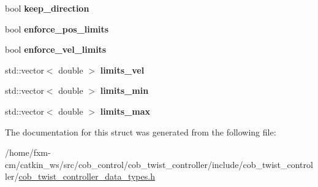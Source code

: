 \begin{DoxyCompactItemize}
\item 
\hypertarget{structTwistControllerParams_a18da932a0624fb5499507392175132cc}{bool {\bfseries keep\-\_\-direction}}\label{structTwistControllerParams_a18da932a0624fb5499507392175132cc}

\item 
\hypertarget{structTwistControllerParams_af84880928b522f0be3d1ed4558dab106}{bool {\bfseries enforce\-\_\-pos\-\_\-limits}}\label{structTwistControllerParams_af84880928b522f0be3d1ed4558dab106}

\item 
\hypertarget{structTwistControllerParams_a1b2aff868e1d52ec02aace9d36131a20}{bool {\bfseries enforce\-\_\-vel\-\_\-limits}}\label{structTwistControllerParams_a1b2aff868e1d52ec02aace9d36131a20}

\item 
\hypertarget{structTwistControllerParams_a86b1bc3844ddff53b417a19ccfc460be}{std\-::vector$<$ double $>$ {\bfseries limits\-\_\-vel}}\label{structTwistControllerParams_a86b1bc3844ddff53b417a19ccfc460be}

\item 
\hypertarget{structTwistControllerParams_af7544aceba6c8ab3397d2ee8dcbc5b4e}{std\-::vector$<$ double $>$ {\bfseries limits\-\_\-min}}\label{structTwistControllerParams_af7544aceba6c8ab3397d2ee8dcbc5b4e}

\item 
\hypertarget{structTwistControllerParams_a133e7f291118bdbda18a67df38eac6a8}{std\-::vector$<$ double $>$ {\bfseries limits\-\_\-max}}\label{structTwistControllerParams_a133e7f291118bdbda18a67df38eac6a8}

\end{DoxyCompactItemize}


The documentation for this struct was generated from the following file\-:\begin{DoxyCompactItemize}
\item 
/home/fxm-\/cm/catkin\-\_\-ws/src/cob\-\_\-control/cob\-\_\-twist\-\_\-controller/include/cob\-\_\-twist\-\_\-controller/\hyperlink{cob__twist__controller__data__types_8h}{cob\-\_\-twist\-\_\-controller\-\_\-data\-\_\-types.\-h}\end{DoxyCompactItemize}
